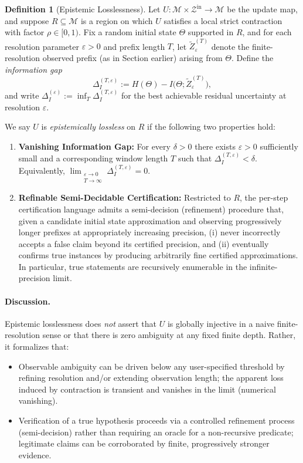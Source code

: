 \documentclass[12pt]{article}
\theoremstyle{definition}
\newtheorem{definition}{Definition}[section]
\theoremstyle{plain}
\begin{document}
\begin{definition}[Epistemic Losslessness]
Let \(U:\mathcal{M}\times\mathcal{Z}^{\mathrm{in}}\to\mathcal{M}\) be the update map, and suppose \(R\subseteq\mathcal{M}\) is a region on which \(U\) satisfies a local strict contraction with factor \(\rho\in[0,1)\). Fix a random initial state \(\Theta\) supported in \(R\), and for each resolution parameter \(\varepsilon>0\) and prefix length \(T\), let \(\widetilde Z^{(T)}_{\varepsilon}\) denote the finite-resolution observed prefix (as in Section earlier) arising from \(\Theta\). Define the \emph{information gap}
\[
\Delta_I^{(T,\varepsilon)} := H(\Theta) - I\!\bigl(\Theta;\widetilde Z^{(T)}_{\varepsilon}\bigr),
\]
and write \(\Delta_I^{(\varepsilon)} := \inf_{T} \Delta_I^{(T,\varepsilon)}\) for the best achievable residual uncertainty at resolution \(\varepsilon\).

We say \(U\) is \emph{epistemically lossless} on \(R\) if the following two properties hold:
\begin{enumerate}
  \item \textbf{Vanishing Information Gap:} For every \(\delta>0\) there exists \(\varepsilon>0\) sufficiently small and a corresponding window length \(T\) such that \(\Delta_I^{(T,\varepsilon)} < \delta\). Equivalently, \(\lim_{\substack{\varepsilon\to 0\\ T\to\infty}} \Delta_I^{(T,\varepsilon)} = 0\).  
  \item \textbf{Refinable Semi-Decidable Certification:} Restricted to \(R\), the per-step certification language admits a semi-decision (refinement) procedure that, given a candidate initial state approximation and observing progressively longer prefixes at appropriately increasing precision, (i) never incorrectly accepts a false claim beyond its certified precision, and (ii) eventually confirms true instances by producing arbitrarily fine certified approximations. In particular, true statements are recursively enumerable in the infinite-precision limit.
\end{enumerate}
\end{definition}

\paragraph{Discussion.} Epistemic losslessness does \emph{not} assert that \(U\) is globally injective in a naive finite-resolution sense or that there is zero ambiguity at any fixed finite depth. Rather, it formalizes that:
\begin{itemize}
  \item Observable ambiguity can be driven below any user-specified threshold by refining resolution and/or extending observation length; the apparent loss induced by contraction is transient and vanishes in the limit (numerical vanishing).  
  \item Verification of a true hypothesis proceeds via a controlled refinement process (semi-decision) rather than requiring an oracle for a non-recursive predicate; legitimate claims can be corroborated by finite, progressively stronger evidence.
\end{itemize}
\end{document}
